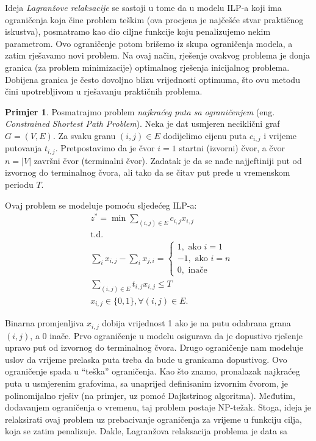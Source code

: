 \documentclass[a4paper, utf8, 11pt, colorlinks]{book}
\theoremstyle{definition}
\newtheorem{primjer}{Primjer}[chapter]
\begin{document}
Ideja \emph{Lagranžove relaksacije} se sastoji u tome da u modelu ILP-a  koji ima  ograničenja koja čine problem teškim (ova procjena je najčešće stvar praktičnog iskustva),  posmatramo kao dio ciljne funkcije koju penalizujemo nekim parametrom.  %
Ovo ograničenje potom brišemo iz skupa ograničenja modela, a zatim rješavamo novi problem. Na ovaj način, rješenje ovakvog problema je donja granica (za problem minimizacije)  optimalnog rješenja inicijalnog problema. Dobijena granica je često dovoljno blizu vrijednosti optimuma, što ovu metodu čini upotrebljivom u rješavanju praktičnih problema. 

\begin{primjer} Posmatrajmo problem \emph{najkraćeg puta sa ograničenjem} (eng. \emph{Constrained Shortest Path Problem}). Neka je dat usmjeren neciklični graf $G=(V,E)$. Za svaku granu $(i,j) \in E$ dodijelimo cijenu puta $c_{i,j}$ i vrijeme putovanja $t_{i,j}$. Pretpostavimo da je čvor $i=1$ startni (izvorni) čvor, a čvor $n = |V|$   završni čvor (terminalni čvor). Zadatak je da se nađe najjeftiniji put  od izvornog do terminalnog čvora, ali tako da se čitav put pređe u vremenskom periodu $T$.
\end{primjer}
Ovaj problem se modeluje pomoću sljedećeg ILP-a:
 \begin{align}
    &z^*=\min\sum_{(i,j) \in E }c_{i,j}x_{i,j} \\
    &\mbox{t.d. }\\
    & \sum_{i} x_{i,j} - \sum_{i} x_{j,i} = \begin{cases}  
                                               1, \mbox{ ako } i=1 \\
                                              -1, \mbox{ ako } i=n \\
                                               0, \mbox{ inače }
                                            \end{cases} \\
    & \sum_{(i,j) \in E} t_{i,j} x_{i,j} \leq T \\
    & x_{i,j} \in \{0, 1 \}, \forall (i,j) \in E.
\end{align} 

Binarna promjenljiva $x_{i,j}$ dobija vrijednost 1 ako je  na   putu odabrana grana $(i,j)$, a 0 inače. 
Prvo ograničenje u modelu osigurava da je dopustivo rješenje upravo put od izvornog do terminalnog čvora. Drugo ograničenje nam modeluje uslov da vrijeme prelaska puta treba da bude u  granicama dopustivog. Ovo ograničenje spada u ``teška'' ograničenja. Kao što znamo,  pronalazak najkraćeg puta u usmjerenim grafovima, sa unaprijed definisanim izvornim čvorom, je polinomijalno rješiv (na primjer, uz pomoć Dajkstrinog algoritma). Međutim,  dodavanjem ograničenja o vremenu, taj problem postaje NP-težak. Stoga, ideja je  relaksirati ovaj problem uz prebacivanje ograničenja za vrijeme u funkciju cilja, koja se zatim penalizuje. 
Dakle, Lagranžova relaksacija problema je data sa
\end{document}
